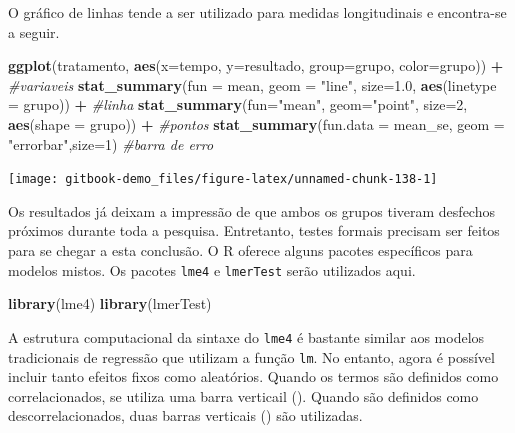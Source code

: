 \documentclass[
]{book}
\newenvironment{Shaded}{\begin{snugshade}}{\end{snugshade}}
\newcommand{\CommentTok}[1]{\textcolor[rgb]{0.56,0.35,0.01}{\textit{#1}}}
\newcommand{\DataTypeTok}[1]{\textcolor[rgb]{0.13,0.29,0.53}{#1}}
\newcommand{\DecValTok}[1]{\textcolor[rgb]{0.00,0.00,0.81}{#1}}
\newcommand{\FloatTok}[1]{\textcolor[rgb]{0.00,0.00,0.81}{#1}}
\newcommand{\KeywordTok}[1]{\textcolor[rgb]{0.13,0.29,0.53}{\textbf{#1}}}
\newcommand{\NormalTok}[1]{#1}
\newcommand{\OperatorTok}[1]{\textcolor[rgb]{0.81,0.36,0.00}{\textbf{#1}}}
\newcommand{\StringTok}[1]{\textcolor[rgb]{0.31,0.60,0.02}{#1}}
\begin{document}
O gráfico de linhas tende a ser utilizado para medidas longitudinais e encontra-se a seguir.

\begin{Shaded}
\begin{Highlighting}[]
\KeywordTok{ggplot}\NormalTok{(tratamento, }\KeywordTok{aes}\NormalTok{(}\DataTypeTok{x=}\NormalTok{tempo, }\DataTypeTok{y=}\NormalTok{resultado, }
                       \DataTypeTok{group=}\NormalTok{grupo, }\DataTypeTok{color=}\NormalTok{grupo)) }\OperatorTok{+}\StringTok{ }\CommentTok{#variaveis}
\StringTok{  }\KeywordTok{stat_summary}\NormalTok{(}\DataTypeTok{fun =}\NormalTok{ mean, }\DataTypeTok{geom =} \StringTok{"line"}\NormalTok{, }\DataTypeTok{size=}\FloatTok{1.0}\NormalTok{, }
               \KeywordTok{aes}\NormalTok{(}\DataTypeTok{linetype =}\NormalTok{ grupo)) }\OperatorTok{+}\StringTok{ }\CommentTok{#linha}
\StringTok{  }\KeywordTok{stat_summary}\NormalTok{(}\DataTypeTok{fun=}\StringTok{"mean"}\NormalTok{, }\DataTypeTok{geom=}\StringTok{"point"}\NormalTok{, }\DataTypeTok{size=}\DecValTok{2}\NormalTok{, }
               \KeywordTok{aes}\NormalTok{(}\DataTypeTok{shape =}\NormalTok{ grupo)) }\OperatorTok{+}\StringTok{ }\CommentTok{#pontos}
\StringTok{  }\KeywordTok{stat_summary}\NormalTok{(}\DataTypeTok{fun.data =}\NormalTok{ mean_se, }
               \DataTypeTok{geom =} \StringTok{"errorbar"}\NormalTok{,}\DataTypeTok{size=}\DecValTok{1}\NormalTok{) }\CommentTok{#barra de erro}
\end{Highlighting}
\end{Shaded}

\begin{center}\texttt{[image: gitbook-demo\_files/figure-latex/unnamed-chunk-138-1]} \end{center}

Os resultados já deixam a impressão de que ambos os grupos tiveram desfechos próximos durante toda a pesquisa. Entretanto, testes formais precisam ser feitos para se chegar a esta conclusão. O R oferece alguns pacotes específicos para modelos mistos. Os pacotes \texttt{lme4} e \texttt{lmerTest} serão utilizados aqui.

\begin{Shaded}
\begin{Highlighting}[]
\KeywordTok{library}\NormalTok{(lme4)}
\KeywordTok{library}\NormalTok{(lmerTest)}
\end{Highlighting}
\end{Shaded}

A estrutura computacional da sintaxe do \texttt{lme4} é bastante similar aos modelos tradicionais de regressão que utilizam a função \texttt{lm}. No entanto, agora é possível incluir tanto efeitos fixos como aleatórios. Quando os termos são definidos como correlacionados, se utiliza uma barra verticail (\textbar). Quando são definidos como descorrelacionados, duas barras verticais (\textbar\textbar) são utilizadas.
\end{document}
